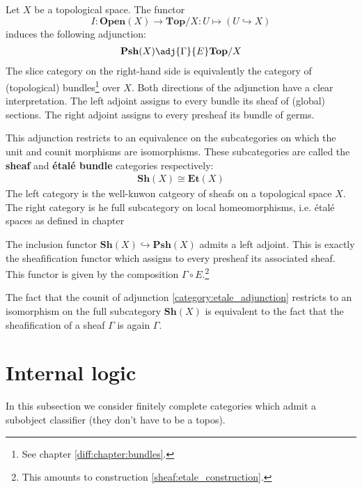 	\begin{construct}
		Let $X$ be a topological space. The functor \[I:\textbf{Open}(X)\rightarrow\textbf{Top}/X:U\mapsto(U\hookrightarrow X)\] induces the following adjunction:
		\begin{gather}
			\label{category:etale_adjunction}
			\textbf{Psh}(X) \adj{\Gamma}{E} \textbf{Top}/X
		\end{gather}
		The slice category on the right-hand side is equivalently the category of (topological) bundles\footnote{See chapter \ref{diff:chapter:bundles}.} over $X$. Both directions of the adjunction have a clear interpretation. The left adjoint assigns to every bundle its sheaf of (global) sections. The right adjoint assigns to every presheaf its bundle of germs.
		
		This adjunction restricts to an equivalence on the subcategories on which the unit and counit morphisms are isomorphisms. These subcategories are called the \textbf{sheaf} and \textbf{\'etal\'e bundle} categories respectively:
		\begin{gather}
			\textbf{Sh}(X) \cong \textbf{Et}(X)
		\end{gather}
		The left category is the well-knwon catgeory of sheafs on a topological space $X$. The right category is he full subcategory on local homeomorphisms, i.e. \'etal\'e spaces as defined in chapter 
	\end{construct}
	
	\begin{property}
		The inclusion functor $\textbf{Sh}(X)\hookrightarrow\textbf{Psh}(X)$ admits a left adjoint. This is exactly the sheafification functor which assigns to every presheaf its associated sheaf. This functor is given by the composition $\Gamma\circ E$.\footnote{This amounts to construction \ref{sheaf:etale_construction}.}
		
		The fact that the counit of adjunction \ref{category:etale_adjunction} restricts to an isomorphism on the full subcategory $\textbf{Sh}(X)$ is equivalent to the fact that the sheafification of a sheaf $\Gamma$ is again $\Gamma$.
	\end{property}

	
\section{Internal logic}\label{cat:internal_logic}

	In this subsection we consider finitely complete categories which admit a subobject classifier (they don't have to be a topos).
	
